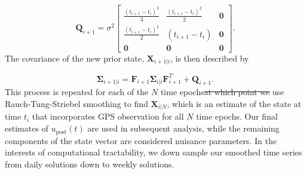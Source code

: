 \documentclass[draft,linenumbers]{AGUJournal}
\providecommand{\DIFadd}[1]{{\protect\color{blue}\uwave{#1}}} %
\providecommand{\DIFdel}[1]{{\protect\color{red}\sout{#1}}}                      %
\providecommand{\DIFaddbegin}{} %
\providecommand{\DIFaddend}{} %
\providecommand{\DIFdelbegin}{} %
\providecommand{\DIFdelend}{} %
\begin{document}
\begin{equation}
  \mathbf{Q}_{i+1} = 
  \sigma^2 \left[
  \begin{array}{ccc}
  \frac{(t_{i+1} - t_i)^3}{3} & \frac{(t_{i+1} - t_{i})^2}{2} & \mathbf{0}\\
  \frac{(t_{i+1} - t_i)^2}{2} & (t_{i+1} - t_{i}) & \mathbf{0}\\ 
  \mathbf{0} & \mathbf{0} & \mathbf{0}
  \end{array}
  \right].
\end{equation}
The covariance of the new prior state, $\mathbf{X}_{i+1|i}$, is then described by

\begin{equation}
  \mathbf{\Sigma}_{i+1|i} = \mathbf{F}_{i+1}\mathbf{\Sigma}_{i|i}\mathbf{F}^T_{i+1} + \mathbf{Q}_{i+1}.
\end{equation}
This process is repeated for each of the $N$ time epochs\DIFdelbegin \DIFdel{at which point we }\DIFdelend \DIFaddbegin \DIFadd{.  We then }\DIFaddend use Rauch-Tung-Striebel smoothing \citep{Rauch1965} to find $\mathbf{X}_{i|N}$, which is an estimate of the state at time $t_i$ that incorporates GPS observation for all $N$ time epochs.  Our final estimates of $u_\mathrm{post}(t)$ are used in subsequent analysis, while the remaining components of the state vector are considered nuisance parameters. In the interests of computational tractability, we down sample our smoothed time series from daily solutions down to weekly solutions.
\end{document}
